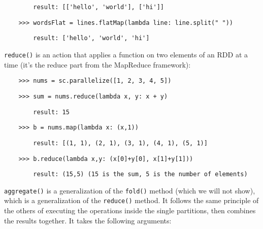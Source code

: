 \begin{lstlisting}
        result: [['hello', 'world'], ['hi']]
\end{lstlisting}

\begin{lstlisting}
    >>> wordsFlat = lines.flatMap(lambda line: line.split(" "))
\end{lstlisting}

\begin{lstlisting}
        result: ['hello', 'world', 'hi']
\end{lstlisting}


\texttt{reduce()} is an action that applies a function on two elements of an RDD at a time (it's the reduce part from the MapReduce framework):

\begin{lstlisting}
    >>> nums = sc.parallelize([1, 2, 3, 4, 5])
\end{lstlisting}

\begin{lstlisting}
    >>> sum = nums.reduce(lambda x, y: x + y)
\end{lstlisting}

\begin{lstlisting}
        result: 15
\end{lstlisting}

\begin{lstlisting}
    >>> b = nums.map(lambda x: (x,1))
\end{lstlisting}

\begin{lstlisting}
        result: [(1, 1), (2, 1), (3, 1), (4, 1), (5, 1)]
\end{lstlisting}

\begin{lstlisting}
    >>> b.reduce(lambda x,y: (x[0]+y[0], x[1]+y[1]))
\end{lstlisting}

\begin{lstlisting}
        result: (15,5) (15 is the sum, 5 is the number of elements)
\end{lstlisting}


\texttt{aggregate()} is a generalization of the \texttt{fold()} method (which we will not show), which is a generalization of the \texttt{reduce()} method.
It follows the same principle of the others of executing the operations inside the single partitions, then combines the results together. It takes the following arguments:

